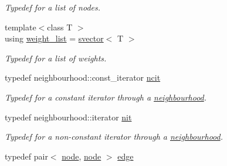 \begin{DoxyCompactItemize}
\begin{DoxyCompactList}\small\item\em Typedef for a list of nodes. \end{DoxyCompactList}\item 
{\footnotesize template$<$class T $>$ }\\using \hyperlink{namespacelgraph_1_1utils_a11e7963f3637ea13778b8d3e69d2c17f}{weight\+\_\+list} = \hyperlink{classlgraph_1_1utils_1_1svector}{svector}$<$ T $>$\hypertarget{namespacelgraph_1_1utils_a11e7963f3637ea13778b8d3e69d2c17f}{}\label{namespacelgraph_1_1utils_a11e7963f3637ea13778b8d3e69d2c17f}

\begin{DoxyCompactList}\small\item\em Typedef for a list of weights. \end{DoxyCompactList}\item 
typedef neighbourhood\+::const\+\_\+iterator \hyperlink{namespacelgraph_1_1utils_a7207b078932845778282f5e2e373575b}{ncit}\hypertarget{namespacelgraph_1_1utils_a7207b078932845778282f5e2e373575b}{}\label{namespacelgraph_1_1utils_a7207b078932845778282f5e2e373575b}

\begin{DoxyCompactList}\small\item\em Typedef for a constant iterator through a \hyperlink{namespacelgraph_1_1utils_a0f2ef47028a466d26841709e705390ac}{neighbourhood}. \end{DoxyCompactList}\item 
typedef neighbourhood\+::iterator \hyperlink{namespacelgraph_1_1utils_af5daf6fe356a9014746bdb507787ae01}{nit}\hypertarget{namespacelgraph_1_1utils_af5daf6fe356a9014746bdb507787ae01}{}\label{namespacelgraph_1_1utils_af5daf6fe356a9014746bdb507787ae01}

\begin{DoxyCompactList}\small\item\em Typedef for a non-\/constant iterator through a \hyperlink{namespacelgraph_1_1utils_a0f2ef47028a466d26841709e705390ac}{neighbourhood}. \end{DoxyCompactList}\item 
typedef pair$<$ \hyperlink{namespacelgraph_1_1utils_a7bd66ede3805ef121bc2835bd48de0cf}{node}, \hyperlink{namespacelgraph_1_1utils_a7bd66ede3805ef121bc2835bd48de0cf}{node} $>$ \hyperlink{namespacelgraph_1_1utils_a6510284ce1b1ae5dc97ce5d2de426e10}{edge}\hypertarget{namespacelgraph_1_1utils_a6510284ce1b1ae5dc97ce5d2de426e10}{}\label{namespacelgraph_1_1utils_a6510284ce1b1ae5dc97ce5d2de426e10}


\end{DoxyCompactItemize}
